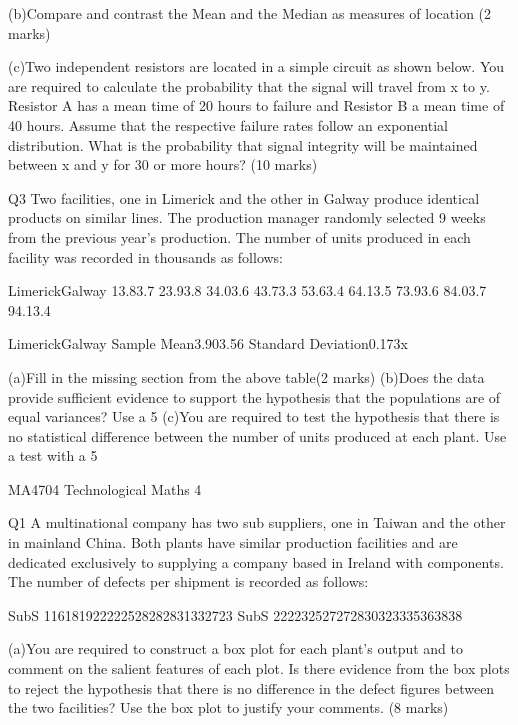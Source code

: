 			(b)Compare and contrast the Mean and the Median as measures of location
			(2 marks)
			
			(c)Two independent resistors are located in a simple circuit as shown below.  You are required to calculate the probability that the signal will travel from x to y.  Resistor A has a mean time of 20 hours to failure and Resistor B a mean time of 40 hours.  Assume that the respective failure rates follow an exponential distribution.  What is the probability that signal integrity will be maintained between x and y for 30 or more hours?
			(10 marks)
			
			
	
			
			
			
			Q3
			Two facilities, one in Limerick and the other in Galway produce identical products on similar lines.  The production manager randomly selected 9 weeks from the previous year’s production.  The number of units produced in each facility was recorded in thousands as follows:
			
			LimerickGalway
			13.83.7
			23.93.8
			34.03.6
			43.73.3
			53.63.4
			64.13.5
			73.93.6
			84.03.7
			94.13.4
			
			
			
			LimerickGalway
			Sample Mean3.903.56
			Standard Deviation0.173x
			
			(a)Fill in the missing section from the above table(2 marks)
			(b)Does the data provide sufficient evidence to support the hypothesis that the populations are of equal variances?  Use a 5%
			(c)You are required to test the hypothesis that there is no statistical difference between the number of units produced at each plant.  Use a test with a 5%
			
			
			
			
			MA4704 Technological Maths 4 
			
			Q1
			A multinational company has two sub suppliers, one in Taiwan and the other in mainland China.  Both plants have similar production facilities and are dedicated exclusively to supplying a company based in Ireland with components.
			The number of defects per shipment is recorded as follows:
			
			SubS 116181922222528282831332723
			SubS 222232527272830323335363838
			
			(a)You are required to construct a box plot for each plant’s output and to comment on the salient features of each plot.  Is there evidence from the box plots to reject the hypothesis that there is no difference in the defect figures between the two facilities?  Use the box plot to justify your comments.
			(8 marks)
			
